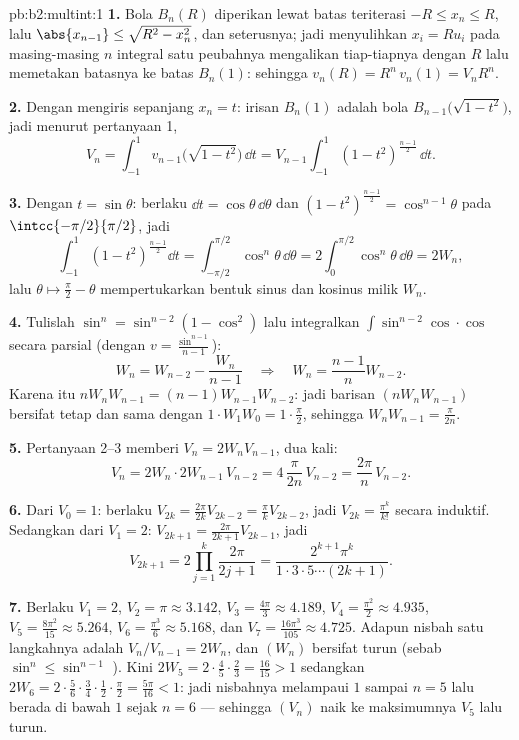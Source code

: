 \begin{solution}{pb:b2:multint:1}
\textbf{1.} Bola $B_n(R)$ diperikan lewat batas teriterasi
$-R \leq x_n \leq R$, lalu $\abs{x_{n-1}} \leq \sqrt{R^2 -
x_n^2}$, dan seterusnya; jadi menyulihkan $x_i = Ru_i$ pada masing-masing
$n$ integral satu peubahnya mengalikan tiap-tiapnya dengan $R$ lalu memetakan
batasnya ke batas $B_n(1)$: sehingga $v_n(R) = R^n\,v_n(1) =
V_nR^n$.

\textbf{2.} Dengan mengiris sepanjang $x_n = t$: irisan $B_n(1)$ adalah
bola $B_{n-1}\bigl(\sqrt{1 - t^2}\bigr)$, jadi menurut pertanyaan
1,
\[
V_n = \int_{-1}^1 v_{n-1}\bigl(\sqrt{1 - t^2}\bigr)\,\dd t
= V_{n-1}\int_{-1}^{1}(1 - t^2)^{\frac{n-1}2}\,\dd t .
\]

\textbf{3.} Dengan $t = \sin\theta$: berlaku $\dd t =
\cos\theta\,\dd\theta$ dan $(1 - t^2)^{\frac{n-1}2} =
\cos^{n-1}\theta$ pada $\intcc{-\pi/2}{\pi/2}$, jadi
\[
\int_{-1}^1(1 - t^2)^{\frac{n-1}2}\dd t
= \int_{-\pi/2}^{\pi/2}\cos^n\theta\,\dd\theta
= 2\int_0^{\pi/2}\cos^n\theta\,\dd\theta = 2W_n,
\]
lalu $\theta \mapsto \frac\pi2 - \theta$ mempertukarkan bentuk sinus
dan kosinus milik $W_n$.

\textbf{4.} Tulislah $\sin^n = \sin^{n-2}(1 - \cos^2)$ lalu
integralkan $\int\sin^{n-2}\cos\cdot\cos$ secara parsial (dengan $v =
\frac{\sin^{n-1}}{n-1}$):
\[
W_n = W_{n-2} - \frac{W_n}{n-1}
\quad\Longrightarrow\quad
W_n = \frac{n-1}{n}W_{n-2}.
\]
Karena itu $nW_nW_{n-1} = (n-1)W_{n-1}W_{n-2}$: jadi barisan
$(nW_nW_{n-1})$ bersifat tetap dan sama dengan $1\cdot W_1W_0 =
1\cdot\frac\pi2$, sehingga $W_nW_{n-1} = \frac{\pi}{2n}$.

\textbf{5.} Pertanyaan 2--3 memberi $V_n = 2W_nV_{n-1}$, dua kali:
\[
V_n = 2W_n\cdot 2W_{n-1}\,V_{n-2}
= 4\,\frac{\pi}{2n}\,V_{n-2} = \frac{2\pi}n\,V_{n-2}.
\]

\textbf{6.} Dari $V_0 = 1$: berlaku $V_{2k} = \frac{2\pi}{2k}V_{2k-2}
= \frac\pi kV_{2k-2}$, jadi $V_{2k} = \frac{\pi^k}{k!}$ secara
induktif. Sedangkan dari $V_1 = 2$: $V_{2k+1} =
\frac{2\pi}{2k+1}V_{2k-1}$, jadi
\[
V_{2k+1} = 2\prod_{j=1}^k\frac{2\pi}{2j+1}
= \frac{2^{k+1}\pi^k}{1\cdot3\cdot5\cdots(2k+1)} .
\]

\textbf{7.} Berlaku $V_1 = 2$, $V_2 = \pi \approx 3.142$, $V_3 =
\frac{4\pi}3 \approx 4.189$, $V_4 = \frac{\pi^2}2 \approx
4.935$, $V_5 = \frac{8\pi^2}{15} \approx 5.264$, $V_6 =
\frac{\pi^3}6 \approx 5.168$, dan $V_7 = \frac{16\pi^3}{105}
\approx 4.725$. Adapun nisbah satu langkahnya adalah $V_n/V_{n-1} = 2W_n$,
dan $(W_n)$ bersifat turun (sebab $\sin^n \leq \sin^{n-1}$
). Kini $2W_5 = 2\cdot\frac45\cdot\frac23 =
\frac{16}{15} > 1$ sedangkan $2W_6 =
2\cdot\frac56\cdot\frac34\cdot\frac12\cdot\frac\pi2 =
\frac{5\pi}{16} < 1$: jadi nisbahnya melampaui $1$ sampai $n = 5$ lalu
berada di bawah $1$ sejak $n = 6$ --- sehingga $(V_n)$ naik ke
maksimumnya $V_5$ lalu turun.


\end{solution}

